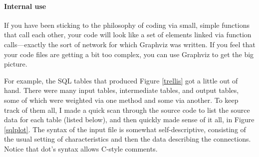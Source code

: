 
 
\paragraph{Internal use}
If you have been sticking to the philosophy of coding via small,
simple functions that call each other, your code will look like a set
of elements linked via function calls---exactly the sort of network for
which Graphviz was written. If you feel that your code files are getting
a bit too complex, you can use Graphviz to get the big picture.

For example, the SQL tables that produced Figure
\ref{trellis} got a little out of hand. There were many input tables,
intermediate tables, and output tables, some of which were weighted
via one method and some via another. To keep track of them all, I made
a quick scan through the source code to list the source data for each
table (listed below), and then  quickly made sense of it all,
in Figure \ref{sqlplot}.  The syntax of the input file is somewhat
self-descriptive, consisting of the usual setting of characteristics
and then the data describing the connections. Notice that dot's syntax
allows C-style comments.

